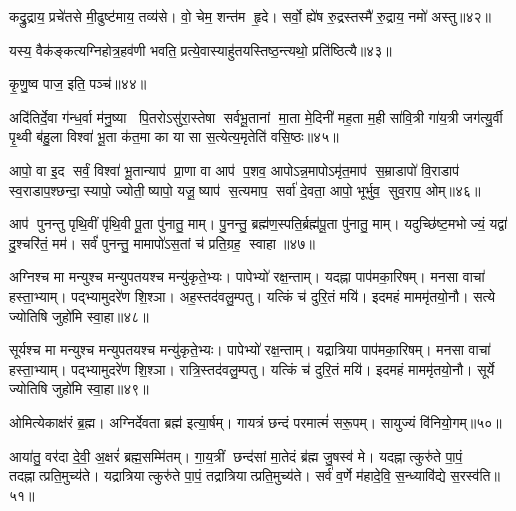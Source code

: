 कद्रु॒द्राय॒ प्रचे॑तसे मी॒ढुष्ट॑माय॒ तव्य॑से। 
वो॒ चेम॒ शन्त॑म हृ॒दे। 
सर्वो॒ ह्ये॑ष रु॒द्रस्तस्मै॑ रु॒द्राय॒ नमो॑ अस्तु॥४२॥
\anuvakamend

यस्य॒ वैक॑ङ्कत्यग्निहोत्र॒हव॑णी भवति॒ प्रत्ये॒वास्याहु॑तय\-स्तिष्ठ॒न्त्यथो॒ प्रति॑ष्ठित्यै॥४३॥
\anuvakamend


कृ॒णु॒ष्व पाज॒ इति॒ पञ्च॑॥४४॥
\anuvakamend

अदि॑तिर्दे॒वा ग॑न्ध॒र्वा म॑नु॒ष्या पि॒तरोऽसु॑रा॒स्तेषा सर्वभू॒तानां मा॒ता मे॒दिनी॑ मह॒ता म॒ही सा॑वि॒त्री गा॑य॒त्री जग॑त्यु॒र्वी पृ॒थ्वी ब॑हु॒ला विश्वा॑ भू॒ता क॑त॒मा का या सा स॒त्येत्य॒मृतेति॑ वसि॒ष्ठः॥४५॥
\anuvakamend

आपो॒ वा इ॒द सर्वं॒ विश्वा॑ भू॒तान्याप॑ प्रा॒णा वा आप॑ प॒शव॒ आपोऽन्न॒मापोऽमृ॑त॒माप॑ स॒म्राडापो॑ वि॒राडाप॑ स्व॒राडाप॒श्छन्दा॒स्यापो॒ ज्योती॒ष्यापो॒ यजू॒ष्याप॑ स॒त्यमाप॒ सर्वा॑ दे॒वता॒ आपो॒ भूर्भुव॒ सुव॒राप॒ ओम्॥४६॥
\anuvakamend

आप॑ पुनन्तु पृथि॒वीं पृ॑थि॒वी पू॒ता पु॑नातु॒ माम्। 
पु॒नन्तु॒ ब्रह्म॑ण॒स्पति॒र्ब्रह्म॑पू॒ता पु॑नातु॒ माम्। 
यदुच्छि॑ष्ट॒मभोज्यं॒ यद्वा॑ दु॒श्चरि॑तं॒ मम॑। 
सर्वं॑ पुनन्तु॒ मामापो॑ऽस॒तां च॑ प्रति॒ग्रह॒ स्वाहा॥४७॥
\anuvakamend


अग्निश्च मा मन्युश्च मन्युपतयश्च मन्यु॑कृते॒भ्यः। 
पापेभ्यो॑ रक्ष॒न्ताम्। 
यदह्ना पाप॑मका॒रिषम्। 
मनसा वाचा॑ हस्ता॒भ्याम्। 
पद्भ्यामुदरे॑ण शि॒श्ञा। 
अह॒स्तद॑वलु॒म्पतु। 
यत्किं च॑ दुरि॒तं मयि॑। 
इदमहं माममृ॑तयो॒नौ। 
सत्ये ज्योतिषि जुहो॑मि स्वा॒हा॥४८॥
\anuvakamend


सूर्यश्च मा मन्युश्च मन्युपतयश्च मन्यु॑कृते॒भ्यः। 
पापेभ्यो॑ रक्ष॒न्ताम्। 
यद्रात्रिया पाप॑मका॒रिषम्। 
मनसा वाचा॑ हस्ता॒भ्याम्। 
पद्भ्यामुदरे॑ण शि॒श्ञा। 
रात्रि॒स्तद॑वलु॒म्पतु। 
यत्किं च॑ दुरि॒तं मयि॑। 
इदमहं माममृ॑तयो॒नौ। 
सूर्ये ज्योतिषि जुहो॑मि स्वा॒हा॥४९॥
\anuvakamend

ओमित्येकाक्ष॑रं ब्र॒ह्म। 
अग्निर्देवता ब्रह्म॑ इत्या॒र्\mbox{}षम्। 
गायत्रं छन्दं परमात्मं॑ सरू॒पम्। 
सायुज्यं वि॑नियो॒गम्॥५०॥
\anuvakamend

आया॑तु॒ वर॑दा दे॒वी॒ अ॒क्षरं॑ ब्रह्म॒सम्मि॑तम्। 
गा॒य॒त्रीं छन्द॑सां मा॒तेदं ब्र॑ह्म जु॒षस्व॑ मे। 
यदह्नात्कुरु॑ते पा॒पं॒ तदह्नात्प्रति॒मुच्य॑ते। 
यद्रात्रियात्कुरु॑ते पा॒पं॒ तद्रात्रियात्प्रति॒मुच्य॑ते। 
सर्व॑ व॒र्णे म॑हादे॒वि॒ स॒न्ध्यावि॑द्ये स॒रस्व॑ति॥५१॥ 
\anuvakamend

